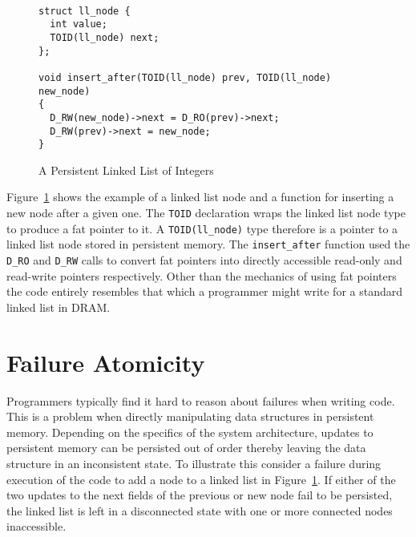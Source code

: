 \documentclass[twocolumn]{article}
\begin{document}
\begin{figure}
{ \scriptsize
\begin{verbatim}

struct ll_node {
  int value;
  TOID(ll_node) next;
};

void insert_after(TOID(ll_node) prev, TOID(ll_node) new_node)
{
  D_RW(new_node)->next = D_RO(prev)->next;
  D_RW(prev)->next = new_node;
}

\end{verbatim}
}
\caption{A Persistent Linked List of Integers}
\label{fig:example}
\end{figure}

Figure~\ref{fig:example} shows the example of a linked list node and a function
for inserting a new node after a given one. The {\tt TOID} declaration wraps the
linked list node type to produce a fat pointer to it. A {\tt TOID(ll\_node)}
type therefore is a pointer to a linked list node stored in persistent memory.
The {\tt insert\_after} function used the {\tt D\_RO} and {\tt D\_RW} calls to
convert fat pointers into directly accessible read-only and read-write pointers
respectively. Other than the mechanics of using fat pointers the code entirely
resembles that which a programmer might write for a standard linked list in
DRAM.

\section{Failure Atomicity}
Programmers typically find it hard to reason about failures when writing
code. This is a problem when directly manipulating data structures in persistent
memory. Depending on the specifics of the system architecture, updates to
persistent memory can be persisted out of order thereby leaving  the data
structure in an inconsistent state. To illustrate this consider a failure during
execution of the code to add a node to a linked list in
Figure~\ref{fig:example}. If either of the two updates to the next fields of the
previous or new node fail to be persisted, the linked list is left in a
disconnected state with one or more connected nodes inaccessible.
\end{document}
